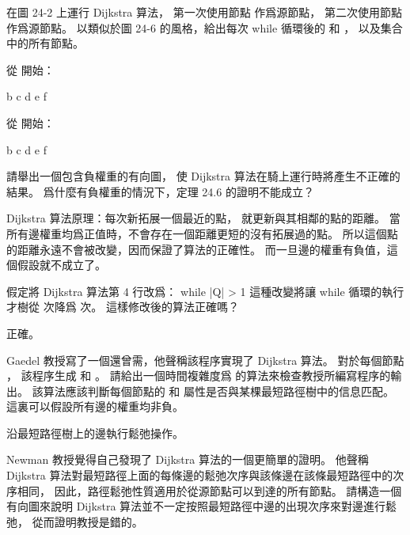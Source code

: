 \startsection[
  title={Dijkstra’s algorithm},
]

\startEXERCISE
在圖 24-2 上運行 Dijkstra 算法，
第一次使用節點  作爲源節點，
第二次使用節點  作爲源節點。
以類似於圖 24-6 的風格，給出每次 {\EMP while} 循環後的  和 \m{\pi}，
以及集合  中的所有節點。
\stopEXERCISE

\startANSWER
從  開始：

{\externalfigure[output/e24_3_1-2]}{b}
{\externalfigure[output/e24_3_1-3]}{c}
{\externalfigure[output/e24_3_1-4]}{d}
{\externalfigure[output/e24_3_1-5]}{e}
{\externalfigure[output/e24_3_1-6]}{f}
\stopcombination

從  開始：

{\externalfigure[output/e24_3_1-8]}{b}
{\externalfigure[output/e24_3_1-9]}{c}
{\externalfigure[output/e24_3_1-10]}{d}
{\externalfigure[output/e24_3_1-11]}{e}
{\externalfigure[output/e24_3_1-12]}{f}
\stopcombination
\stopANSWER

\startEXERCISE
請舉出一個包含負權重的有向圖，
使 Dijkstra 算法在騎上運行時將產生不正確的結果。
爲什麼有負權重的情況下，定理 24.6 的證明不能成立？
\stopEXERCISE

\startANSWER
Dijkstra 算法原理：每次新拓展一個最近的點，
就更新與其相鄰的點的距離。
當所有邊權重均爲正值時，不會存在一個距離更短的沒有拓展過的點。
所以這個點的距離永遠不會被改變，因而保證了算法的正確性。
而一旦邊的權重有負值，這個假設就不成立了。
\stopANSWER

\startEXERCISE
假定將 Dijkstra 算法第 4 行改爲：
\startCLRS
while |Q| > 1
\stopCLRS
這種改變將讓 {\EMP while} 循環的執行才樹從  次降爲  次。
這樣修改後的算法正確嗎？
\stopEXERCISE

\startANSWER
正確。
\stopANSWER

\startEXERCISE
Gaedel 教授寫了一個還曾需，他聲稱該程序實現了 Dijkstra 算法。
對於每個節點 ，
該程序生成  和 。
請給出一個時間複雜度爲  的算法來檢查教授所編寫程序的輸出。
該算法應該判斷每個節點的  和 \m{\pi} 屬性是否與某棵最短路徑樹中的信息匹配。
這裏可以假設所有邊的權重均非負。
\stopEXERCISE

\startANSWER
沿最短路徑樹上的邊執行鬆弛操作。
\stopANSWER

\startEXERCISE
Newman 教授覺得自己發現了 Dijkstra 算法的一個更簡單的證明。
他聲稱 Dijkstra 算法對最短路徑上面的每條邊的鬆弛次序與該條邊在該條最短路徑中的次序相同，
因此，路徑鬆弛性質適用於從源節點可以到達的所有節點。
請構造一個有向圖來說明 Dijkstra 算法並不一定按照最短路徑中邊的出現次序來對邊進行鬆弛，
從而證明教授是錯的。
\stopEXERCISE

